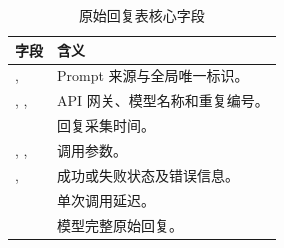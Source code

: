 \begin{table}[t]
\centering
\caption{原始回复表核心字段}
\label{tab:raw-schema}
\small
\begin{tabularx}{\columnwidth}{p{}Y}
\toprule
字段 & 含义 \\
\midrule
{},  & Prompt 来源与全局唯一标识。\\
, ,  & API 网关、模型名称和重复编号。\\
 & 回复采集时间。\\
, ,  & 调用参数。\\
,  & 成功或失败状态及错误信息。\\
 & 单次调用延迟。\\
 & 模型完整原始回复。\\
\bottomrule
\end{tabularx}
\end{table}
